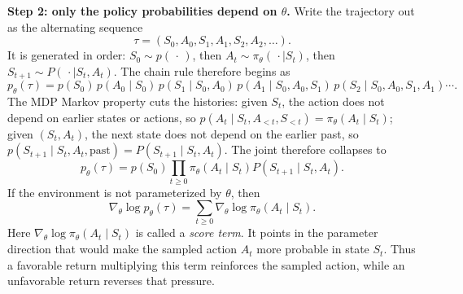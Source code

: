 \documentclass[11pt,a4paper]{article}
\theoremstyle{definition}
\begin{document}
\begin{note}
\medskip\noindent\textbf{Step 2: only the policy probabilities depend on \(\theta\).}
Write the trajectory out as the alternating sequence
\[
\tau
=
(S_0,A_0,S_1,A_1,S_2,A_2,\dots).
\]
It is generated in order: $S_0\sim p(\,\cdot\,)$, then $A_t\sim\pi_\theta(\,\cdot\mid S_t)$, then $S_{t+1}\sim P(\,\cdot\mid S_t,A_t)$. The chain rule therefore begins as
\[
p_\theta(\tau)
=
p(S_0)\,
p(A_0\mid S_0)\,
p(S_1\mid S_0,A_0)\,
p(A_1\mid S_0,A_0,S_1)\,
p(S_2\mid S_0,A_0,S_1,A_1)
\cdots.
\]
The MDP Markov property cuts the histories: given $S_t$, the action does not depend on earlier states or actions, so $p(A_t\mid S_t,A_{<t},S_{<t})=\pi_\theta(A_t\mid S_t)$; given $(S_t,A_t)$, the next state does not depend on the earlier past, so $p(S_{t+1}\mid S_t,A_t,\text{past})=P(S_{t+1}\mid S_t,A_t)$. The joint therefore collapses to
\[
p_\theta(\tau)
=
p(S_0)\prod_{t\geq0}
\pi_\theta(A_t\mid S_t)P(S_{t+1}\mid S_t,A_t).
\]
If the environment is not parameterized by $\theta$, then
\[
\nabla_\theta\log p_\theta(\tau)
=\sum_{t\geq0}\nabla_\theta\log\pi_\theta(A_t\mid S_t).
\]
\noindent Here $\nabla_\theta\log\pi_\theta(A_t\mid S_t)$ is called a \emph{score term}.
It points in the parameter direction that would make the sampled action $A_t$ more probable
in state $S_t$. Thus a favorable return multiplying this term reinforces the sampled action,
while an unfavorable return reverses that pressure.


\end{note}
\end{document}
